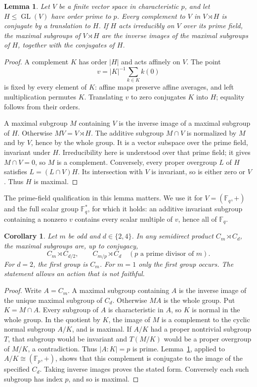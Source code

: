 \documentclass[11pt,a4paper]{article}
\newtheorem{lemma}[theorem]{Lemma}
\newtheorem{corollary}[theorem]{Corollary}
\newcommand{\F}{\mathbb F}
\begin{document}
\begin{lemma}\label{affine}
Let $V$ be a finite vector space in characteristic $p$, and let
$H\le\operatorname{GL}(V)$ have order prime to $p$. Every complement
to $V$ in $V\rtimes H$ is conjugate by a translation to $H$.
If $H$ acts irreducibly on $V$ over its prime field, the maximal subgroups of $V\rtimes H$
are the inverse images of the maximal subgroups of $H$, together
with the conjugates of $H$.
\end{lemma}
\begin{proof}
A complement $K$ has order $|H|$ and acts affinely on $V$. The point
\[
                 v=|K|^{-1}\sum_{k\in K}k(0)
\]
is fixed by every element of $K$: affine maps preserve affine
averages, and left multiplication permutes $K$. Translating $v$ to
zero conjugates $K$ into $H$; equality follows from their orders.

A maximal subgroup $M$ containing $V$ is the inverse image of a
maximal subgroup of $H$. Otherwise $MV=V\rtimes H$. The additive
subgroup $M\cap V$ is normalized by $M$ and by $V$, hence by the
whole group. It is a vector subspace over the prime field, invariant
under $H$. Irreducibility here is understood over that prime field;
it gives $M\cap V=0$, so $M$ is a complement. Conversely, every
proper overgroup $L$ of $H$ satisfies
$L=(L\cap V)H$. Its intersection with $V$ is invariant, so is either
zero or $V$. Thus $H$ is maximal.
\end{proof}

The prime-field qualification in this lemma matters. We use it for
$V=(\F_q,+)$ and the full scalar group $\F_q^*$, for which it holds:
an additive invariant subgroup containing a nonzero $v$ contains
every scalar multiple of $v$, hence all of $\F_q$.

\begin{corollary}\label{cyclic}
Let $m$ be odd and $d\in\{2,4\}$. In any semidirect product
$C_m\rtimes C_d$, the maximal subgroups are, up to conjugacy,
\[
 C_m\rtimes C_{d/2},\qquad
 C_{m/p}\rtimes C_d\quad(p\text{ a prime divisor of }m).
\]
For $d=2$, the first group is $C_m$. For $m=1$ only the first
group occurs. The statement allows an action that is not faithful.
\end{corollary}
\begin{proof}
Write $A=C_m$. A maximal subgroup containing $A$ is the inverse
image of the unique maximal subgroup of $C_d$. Otherwise $MA$ is
the whole group. Put $K=M\cap A$. Every subgroup of $A$ is
characteristic in $A$, so $K$ is normal in the whole group. In the
quotient by $K$, the image of $M$ is a complement to the cyclic
normal subgroup $A/K$, and is maximal. If $A/K$ had a proper
nontrivial subgroup $T$, that subgroup would be invariant and
$T(M/K)$ would be a proper overgroup of $M/K$, a contradiction.
Thus $|A:K|=p$ is prime. Lemma~\ref{affine}, applied to
$A/K\cong(\F_p,+)$, shows that this complement is conjugate to
the image of the specified $C_d$. Taking inverse images proves
the stated form. Conversely each such subgroup has index $p$,
and so is maximal.
\end{proof}
\end{document}
